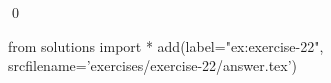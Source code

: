
\begin{ex} 
  \label{ex:exercise-22}
  
  \qed
\end{ex} 
\begin{python0}
from solutions import *
add(label="ex:exercise-22",
    srcfilename='exercises/exercise-22/answer.tex') 
\end{python0}
